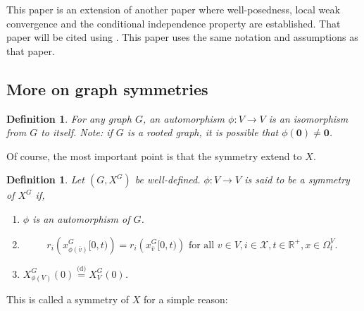 \documentclass[12pt]{article}
\newcommand{\mb}{\mathbb}
\newcommand{\mc}{\mathcal}
\newcommand{\ra}{\rightarrow}
\newcommand{\ov}{\overline}
\newcommand{\te}{\text}
\newcommand{\deq}{\overset{\text{(d)}}{=}}			%
\newcommand{\sta}{\mc{X}}							%
\newcommand{\cl}[1]{\ov{#1}}						%
\renewcommand{\root}{\mathbf{0}}					%
\newcommand{\Xf}{X}									%
\newcommand{\rate}{r}								%
\newcommand{\xf}{x}									%
\newcommand{\vind}[1]{_{#1}}						%
\newcommand{\tme}[1]{(#1)}							%
\newcommand{\tmi}[1]{#1}							%
\newcommand{\gind}[1]{^{#1}}						%
\newcommand{\vpara}[1]{^{#1}}						%
\newcommand{\stpara}[1]{_{#1}}						%
\newcommand{\tpara}[1]{_{#1}}						%
\newtheorem{defn}[thms]{Definition}
\begin{document}
This paper is an extension of another paper where well-posedness, local weak convergence and the conditional independence property are established. That paper will be cited using \cite{F}. This paper uses the same notation and assumptions as that paper.

\subsection{More on graph symmetries}

\begin{defn}
For any graph \(G\), an automorphism \(\phi: V \ra V\) is an isomorphism from \(G\) to itself. Note: if \(G\) is a rooted graph, it is possible that \(\phi(\root) \neq \root\).
\label{a:siso}
\end{defn}

Of course, the most important point is that the symmetry extend to \(\Xf\).

\begin{defn}
Let \((G,\Xf\gind{G})\) be well-defined. \(\phi: V \ra V\) is said to be a symmetry of \(\Xf\gind{G}\) if,

\begin{enumerate}
\item \(\phi\) is an automorphism of \(G\).

\item 

\begin{equation}
\rate\stpara{i}\left(\xf\gind{G}\vind{\phi(\cl{v})}\tmi{[0,t)}\right) = \rate\stpara{i}\left(\xf\gind{G}\vind{\cl{v}}\tmi{[0,t)}\right) \te{ for all } v \in V,i \in \sta, t \in \mb{R}^+, \xf\in \Omega\vpara{V}\tpara{t}.
\label{a::ratesym}
\end{equation}

\item \(\Xf\gind{G}\vind{\phi(V)}\tme{0} \deq \Xf\gind{G}\vind{V}\tme{0}\).
\end{enumerate}
\label{a:Xsim}
\end{defn}

This is called a symmetry of \(\Xf\) for a simple reason:
\end{document}
